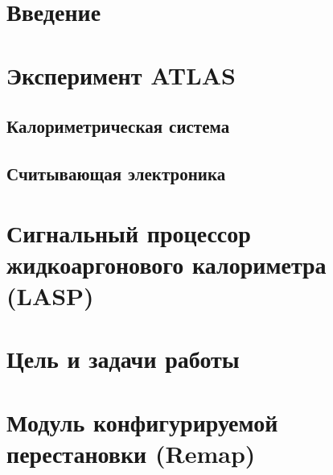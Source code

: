 \documentclass[a4paper, 14pt]{extarticle}
\begin{document}


\tableofcontents
\thispagestyle{empty}
\newpage

\setcounter{page}{3}
\section*{Введение}
    
    \newpage

\section{Эксперимент ATLAS}
    
    \subsection{Калориметрическая система}
    
    \subsection{Считывающая электроника}
    
    \newpage

\section{Сигнальный процессор жидкоаргонового калориметра (LASP)}
    
%    
    \newpage

%    

\section{Цель и задачи работы}
%    
    \newpage

\section{Модуль конфигурируемой перестановки (Remap)}
    
%    
%    
    \newpage
\end{document}
